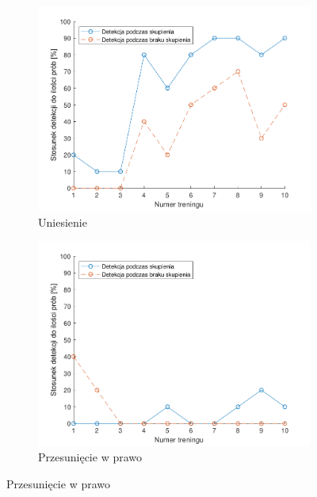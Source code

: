 \documentclass[skorowidz,skroty]{dyplomWEZUT}
\begin{document}
{    \begin{figure}[htbp]
        \begin{subfigure}{0.49\textwidth}
        \includegraphics[width=\linewidth]{graphic/up}
        \caption{Uniesienie\label{fig:training_emotiv_up}}
        \end{subfigure}\hspace*{\fill}
        \begin{subfigure}{0.49\textwidth}
        \includegraphics[width=\linewidth]{graphic/right}
        \caption{Przesunięcie w prawo\label{fig:training_emotiv_right}}
        \end{subfigure}
        

\end{figure}}
\end{document}
